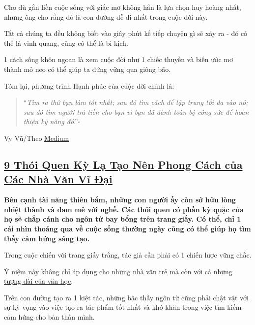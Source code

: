 \documentclass{article}
\begin{document}
Cho dù gắn liền cuộc sống với giấc mơ không hẳn là lựa chọn huy hoàng nhất, nhưng ông cho rằng đó là con đường dễ đi nhất trong cuộc đời này.

%
Tất cả chúng ta đều không biết vào giây phút kế tiếp chuyện gì sẽ xảy ra - đó có thể là vinh quang, cũng có thể là bi kịch.

1 cách sống khôn ngoan là xem cuộc đời như 1 chiếc thuyền và biến ước mơ thành mỏ neo có thể giúp ta đứng vững qua giông bão.

%
Tóm lại, phương trình Hạnh phúc của cuộc đời chính là:
\begin{quotation}
	``\textit{Tìm ra thứ bạn làm tốt nhất; sau đó tìm cách để tập trung tối đa vào nó; sau đó tìm người trả tiền cho bạn vì bạn đã dành toàn bộ công sức để hoàn thiện kỹ năng đó}.''\hfill$\square$
\end{quotation}

\begin{flushright}
	Vy Vũ/Theo \href{https://medium.com/mind-cafe/einsteins-formula-for-a-happy-life-b29aff61a9c7}{Medium}
\end{flushright}


\subsection{\href{http://tramdoc.vn/tin-tuc/9-thoi-quen-ky-la-tao-nen-phong-cach-cua-cac-nha-van-vi-dai-nmwejW.html}{9 Thói Quen Kỳ Lạ Tạo Nên Phong Cách của Các Nhà Văn Vĩ Đại}}

\textbf{Bên cạnh tài năng thiên bẩm, những con người ấy còn sở hữu lòng nhiệt thành và đam mê với nghề. Các thói quen có phần kỳ quặc của họ sẽ chắp cánh cho ngôn từ bay bổng trên trang giấy. Có thể, chỉ 1 cái nhìn thoáng qua về cuộc sống thường ngày cũng có thể giúp họ tìm thấy cảm hứng sáng tạo.}

%
Trong cuộc chiến với trang giấy trắng, tác giả cần phải có 1 chiến lược vững chắc.

Ý niệm này không chỉ áp dụng cho những nhà văn trẻ mà còn với cả \href{http://tramdoc.vn/tin-tuc/10-tac-pham-kinh-dien-tu-giai-nobel-van-hoc-da-duoc-dich-sang-tieng-viet-nyalW.html}{những tượng đài của văn học}.

Trên con đường tạo ra 1 kiệt tác, những bậc thầy ngôn từ cũng phải chật vật với sự kỳ vọng vào việc tạo ra tác phẩm tốt nhất và khó khăn trong việc tìm kiếm cảm hứng cho bản thân mình.
\end{document}
